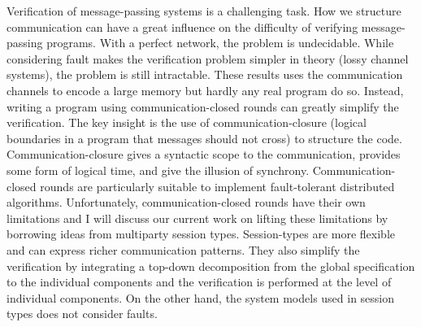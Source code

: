 Verification of message-passing systems is a challenging task. How we structure communication can have a great influence on the difficulty of verifying message-passing programs. With a perfect network, the problem is undecidable. While considering fault makes the verification problem simpler in theory (lossy channel systems), the problem is still intractable. These results uses the communication channels to encode a large memory but hardly any real program do so. Instead, writing a program using communication-closed rounds can greatly simplify the verification. The key insight is the use of communication-closure (logical boundaries in a program that messages should not cross) to structure the code. Communication-closure gives a syntactic scope to the communication, provides some form of logical time, and give the illusion of synchrony. Communication-closed rounds are particularly suitable to implement fault-tolerant distributed algorithms. Unfortunately, communication-closed rounds have their own limitations and I will discuss our current work on lifting these limitations by borrowing ideas from multiparty session types. Session-types are more flexible and can express richer communication patterns. They also simplify the verification by integrating a top-down decomposition from the global specification to the individual components and the verification is performed at the level of individual components. On the other hand, the system models used in session types does not consider faults.